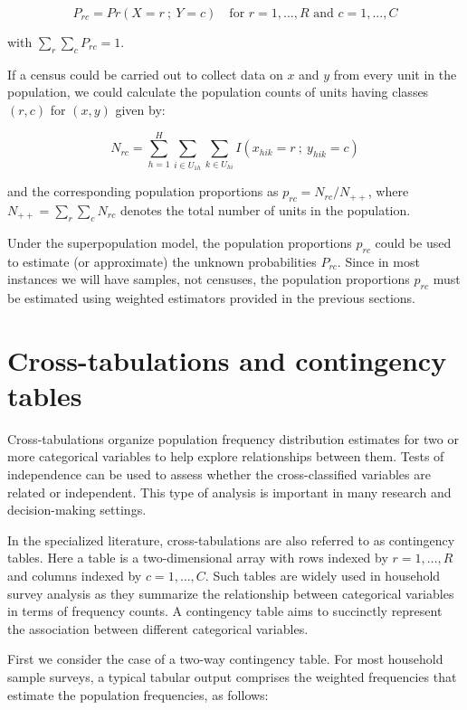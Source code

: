\documentclass[
  12pt,
]{book}
\begin{document}
\[
P_{rc} = Pr \left( X = r \ ; \ Y = c \right) \quad \text{for } r=1,...,R \text{ and } c=1,...,C
\]

with \(\sum_r \sum_c P_{rc} = 1\).

If a census could be carried out to collect data on \(x\) and \(y\) from every unit in the population, we could calculate the population counts of units having classes \((r,c)\) for \((x,y)\) given by:

\[
N_{rc} = \sum_{h=1}^H \sum_{i \in U_{1h}} \sum_{k \in U_{hi}} I \left( x_{hik} = r \ ; \ y_{hik} = c \right)
\]

and the corresponding population proportions as \(p_{rc} = N_{rc} / N_{++}\), where \(N_{++} = \sum_r \sum_c N_{rc}\) denotes the total number of units in the population.

Under the superpopulation model, the population proportions \(p_{rc}\) could be used to estimate (or approximate) the unknown probabilities \(P_{rc}\). Since in most instances we will have samples, not censuses, the population proportions \(p_{rc}\) must be estimated using weighted estimators provided in the previous sections.

\section{Cross-tabulations and contingency tables}\label{cross-tabulations-and-contingency-tables}

Cross-tabulations organize population frequency distribution estimates for two or more categorical variables to help explore relationships between them. Tests of independence can be used to assess whether the cross-classified variables are related or independent. This type of analysis is important in many research and decision-making settings.

In the specialized literature, cross-tabulations are also referred to as contingency tables. Here a table is a two-dimensional array with rows indexed by \(r=1,\ldots,R\) and columns indexed by \(c=1,\ldots,C\). Such tables are widely used in household survey analysis as they summarize the relationship between categorical variables in terms of frequency counts. A contingency table aims to succinctly represent the association between different categorical variables.

First we consider the case of a two-way contingency table. For most household sample surveys, a typical tabular output comprises the weighted frequencies that estimate the population frequencies, as follows:
\end{document}
